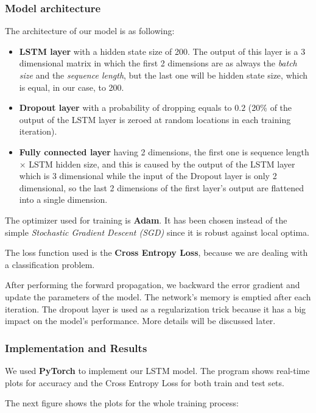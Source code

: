 \documentclass[a4paper,english,12pt]{article}
\begin{document}
\subsubsection{Model architecture}
The architecture of our model is as following:
\begin{itemize}
	\item \textbf{LSTM layer} with a hidden state size of 200. The output of this layer is a 3 dimensional matrix in which the first 2 dimensions are as always the \emph{batch size} and the \emph{sequence length}, but the last one will be hidden state size, which is equal, in our case, to 200.
	\item \textbf{Dropout layer} with a probability of dropping equals to $0.2$ (20\% of the output of the LSTM layer is zeroed at random locations in each training iteration).
	\item \textbf{Fully connected layer} having 2 dimensions, the first one is sequence length $\times$ LSTM hidden size, and this is caused by the output of the LSTM layer which is 3 dimensional while the input of the Dropout layer is only 2 dimensional, so the last 2 dimensions of the first layer's output are flattened into a single dimension.
\end{itemize}

The optimizer used for training is \textbf{Adam}. It has been chosen instead of the simple \emph{Stochastic Gradient Descent (SGD)} since it is robust against local optima.

The loss function used is the \textbf{Cross Entropy Loss}, because we are dealing with a classification problem.

After performing the forward propagation, we backward the error gradient and update the parameters of the model. The network's memory is emptied after each iteration. The dropout layer is used as a regularization trick because it has a big impact on the model's performance. More details will be discussed later. 

\subsubsection{Implementation and Results}
We used \textbf{PyTorch} to implement our LSTM model. The program shows real-time plots for accuracy and the Cross Entropy Loss for both train and test sets.

The next figure shows the plots for the whole training process:
\end{document}
